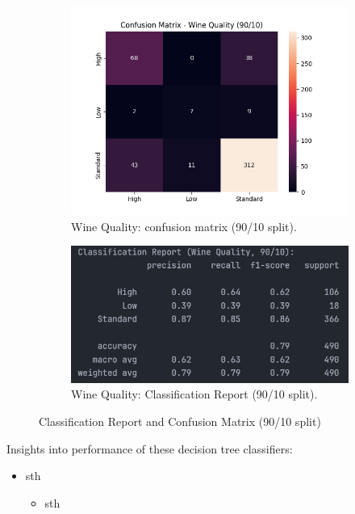 \begin{figure}[H]
	\centering
	\begin{subfigure}{0.45\textwidth}
		\centering
		\includegraphics[width=\textwidth]{imgs/confusion_mat/confusion_mat__wine_quality__90_vs_10.png}
		\caption{Wine Quality: confusion matrix (90/10 split).}\label{fig:wq-cm-90-10}
	\end{subfigure}
	\hfill
	\begin{subfigure}{0.45\textwidth}
		\centering
		\includegraphics[width=\textwidth]{imgs/confusion_mat/class_rp__wine_quality__90_vs_10.png}
		\caption{Wine Quality: Classification Report (90/10 split).}\label{fig:wq-cr-90-10}
	\end{subfigure}

	\caption{Classification Report and Confusion Matrix (90/10 split)}\label{fig:wq-eval-90-10}
\end{figure}
\begin{flushleft}
	Insights into performance of these decision tree classifiers:
	\begin{itemize}
		\item sth
		      \begin{itemize}
			      \item sth
		      \end{itemize}
	\end{itemize}
\end{flushleft}

